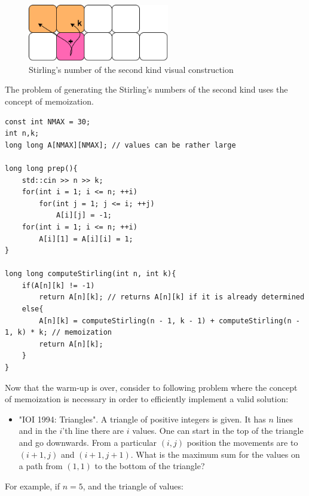 \documentclass[letterpaper]{article}
\begin{document}
\newpage

\begin{figure} [h!]
\centering
\includegraphics[width=0.55\textwidth]{pngOfDiagrams/strirling.png}
\caption{Stirling's number of the second kind visual construction}
\end{figure}

The problem of generating the Stirling's numbers of the second kind uses the concept of memoization.

\begin{lstlisting}
const int NMAX = 30;
int n,k;
long long A[NMAX][NMAX]; // values can be rather large

long long prep(){
    std::cin >> n >> k;
    for(int i = 1; i <= n; ++i)
        for(int j = 1; j <= i; ++j)
            A[i][j] = -1;
    for(int i = 1; i <= n; ++i)
        A[i][1] = A[i][i] = 1;
}

long long computeStirling(int n, int k){
    if(A[n][k] != -1)
        return A[n][k]; // returns A[n][k] if it is already determined
    else{
        A[n][k] = computeStirling(n - 1, k - 1) + computeStirling(n - 1, k) * k; // memoization
        return A[n][k];
    }
}
\end{lstlisting}

Now that the warm-up is over, consider to following problem where the concept of memoization is necessary in order to efficiently implement a valid solution:

\begin{itemize}
    \item "IOI 1994: Triangles". A triangle of positive integers is given. It has $n$ lines and in the $i$'th line there are $i$ values. One can start in the top of the triangle and go downwards. From a particular $(i,j)$ position the movements are to $(i + 1, j)$ and $(i + 1, j + 1)$. What is the maximum sum for the values on a path from $(1,1)$ to the bottom of the triangle?
\end{itemize}

For example, if $n = 5$, and the triangle of values:

\newpage
\end{document}
